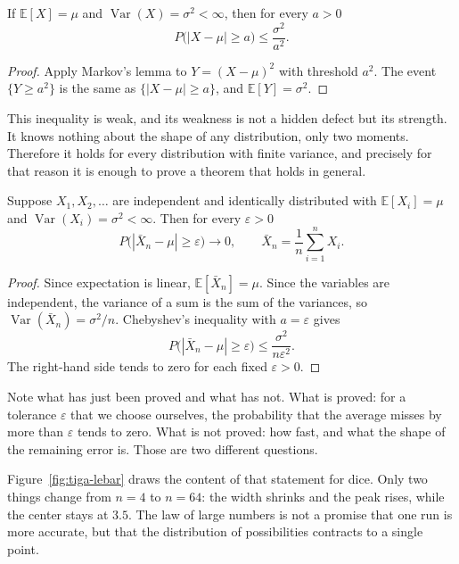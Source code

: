 \begin{akibat}
If $\mathbb{E}[X]=\mu$ and $\operatorname{Var}(X)=\sigma^2<\infty$, then for every
$a>0$
\[
P\bigl(|X-\mu|\ge a\bigr)\le\frac{\sigma^2}{a^2}.
\]
\end{akibat}

\begin{proof}[Proof]
Apply Markov's lemma to $Y=(X-\mu)^2$ with threshold $a^2$. The event
$\{Y\ge a^2\}$ is the same as $\{|X-\mu|\ge a\}$, and $\mathbb{E}[Y]=\sigma^2$.
\end{proof}

This inequality is weak, and its weakness is not a hidden defect but its strength.
It knows nothing about the shape of any distribution, only two moments. Therefore it
holds for every distribution with finite variance, and precisely for that reason it
is enough to prove a theorem that holds in general.


\begin{teorema}
Suppose $X_1,X_2,\dots$ are independent and identically distributed with
$\mathbb{E}[X_i]=\mu$ and $\operatorname{Var}(X_i)=\sigma^2<\infty$. Then for every
$\varepsilon>0$
\[
P\bigl(|\bar X_n-\mu|\ge\varepsilon\bigr)\to0,
\qquad \bar X_n=\frac1n\sum_{i=1}^n X_i .
\]
\end{teorema}

\begin{proof}[Proof]
Since expectation is linear, $\mathbb{E}[\bar X_n]=\mu$. Since the variables are
independent, the variance of a sum is the sum of the variances, so
$\operatorname{Var}(\bar X_n)=\sigma^2/n$. Chebyshev's inequality with
$a=\varepsilon$ gives
\[
P\bigl(|\bar X_n-\mu|\ge\varepsilon\bigr)\le\frac{\sigma^2}{n\varepsilon^2}.
\]
The right-hand side tends to zero for each fixed $\varepsilon>0$.
\end{proof}

Note what has just been proved and what has not. What is proved: for a tolerance
$\varepsilon$ that we choose ourselves, the probability that the average misses by
more than $\varepsilon$ tends to zero. What is not proved: how fast, and what the
shape of the remaining error is. Those are two different questions.

Figure~\ref{fig:tiga-lebar} draws the content of that statement for dice. Only two
things change from $n=4$ to $n=64$: the width shrinks and the peak rises, while the
center stays at $3.5$. The law of large numbers is not a promise that one run is
more accurate, but that the distribution of possibilities contracts to a single
point.

